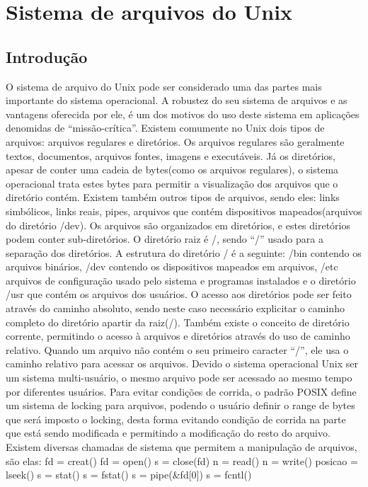 \chapter{Sistema de arquivos do Unix}

\section{Introdução}

O sistema de arquivo do Unix pode ser considerado uma das partes mais importante do sistema operacional. A robustez do seu sistema de arquivos e as vantagens oferecida por ele, é um dos motivos do uso deste sistema em aplicações denomidas de “missão-crítica”.
Existem comumente no Unix dois tipos de arquivos: arquivos regulares e diretórios. Os arquivos regulares são geralmente textos, documentos, arquivos fontes, imagens e executáveis. Já os diretórios, apesar de conter uma cadeia de bytes(como os arquivos regulares),  o sistema operacional trata estes bytes para permitir a visualização dos arquivos que o diretório contém. Existem também outros tipos de arquivos, sendo eles: links simbólicos, links reais, pipes, arquivos que contém dispositivos mapeados(arquivos do diretório /dev).
Os arquivos são organizados em diretórios, e estes diretórios podem conter sub-diretórios. O diretório raiz é /, sendo “/” usado para a separação dos diretórios. A estrutura do diretório / é a seguinte: /bin contendo os arquivos binários, /dev contendo os dispositivos mapeados em arquivos, /etc arquivos de configuração usado pelo sistema e programas instalados e o diretório /usr que contém os arquivos dos usuários. 
O acesso aos diretórios pode ser feito através do caminho absoluto, sendo neste caso necessário explicitar o caminho completo do diretório apartir da raiz(/). Também existe o conceito de diretório corrente, permitindo o acesso à arquivos e diretórios através do uso de caminho relativo. Quando um arquivo não contém o seu primeiro caracter “/”, ele usa o caminho relativo para acessar os arquivos.
Devido o sistema operacional Unix ser um sistema multi-usuário, o mesmo arquivo pode ser acessado ao mesmo tempo por diferentes usuários. Para evitar condições de corrida, o padrão POSIX define um sistema de locking para arquivos, podendo o usuário definir o range de bytes que será imposto o locking, desta forma evitando condição de corrida na parte que está sendo modificada e permitindo a modificação do resto do arquivo.
Existem diversas chamadas de sistema que permitem a manipulação de arquivos, são elas:
fd = creat()
fd = open()
s = close(fd)               
n = read()
n = write()
posicao = lseek()
s = stat()
s = fstat() 
s = pipe(&fd[0])
s = fcntl()

